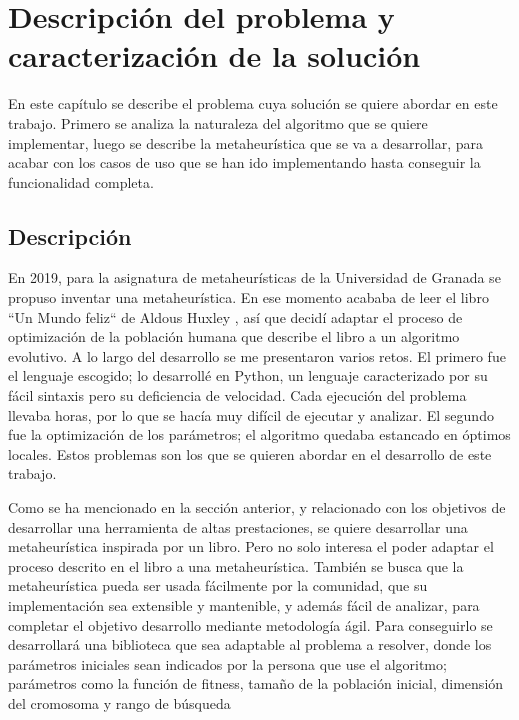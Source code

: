 \chapter{Descripción del problema y caracterización de la solución}

En este capítulo se describe el problema cuya solución se quiere abordar en este trabajo. Primero se analiza la naturaleza del algoritmo que
se quiere implementar, luego se describe la metaheurística que se va a desarrollar, para acabar con los casos de uso que se han ido
implementando hasta conseguir la funcionalidad completa.

\section{Descripción}

En 2019, para la asignatura de metaheurísticas de la Universidad de Granada \cite{merelo_molina_2021} se propuso inventar una 
metaheurística. En ese momento acababa de leer el libro ``Un Mundo feliz`` de Aldous Huxley \cite{un_mundo_feliz_libro}, así que
decidí adaptar el proceso de optimización de la población humana que describe el libro a un algoritmo evolutivo. A lo largo del
desarrollo se me presentaron varios retos. El primero fue el lenguaje escogido; lo desarrollé en Python, un lenguaje caracterizado
por su fácil sintaxis pero su deficiencia de velocidad. Cada ejecución del problema llevaba horas, por lo que se hacía muy difícil
de ejecutar y analizar. El segundo fue la optimización de los parámetros; el algoritmo quedaba estancado en óptimos locales.
Estos problemas son los que se quieren abordar en el desarrollo de este trabajo.

Como se ha mencionado en la sección anterior, y relacionado con los objetivos de desarrollar una herramienta de altas prestaciones,
se quiere desarrollar una metaheurística inspirada por un libro. Pero no solo interesa
el poder adaptar el proceso descrito en el libro a una metaheurística. También se busca que la metaheurística pueda ser
usada fácilmente por la comunidad, que su implementación sea extensible y mantenible, y además fácil de analizar, para completar el objetivo
desarrollo mediante metodología ágil. Para conseguirlo se desarrollará una biblioteca que sea adaptable al problema a resolver, donde los parámetros iniciales sean indicados por la persona que use el algoritmo; parámetros como la función de fitness,
tamaño de la población inicial, dimensión del cromosoma y rango de búsqueda

